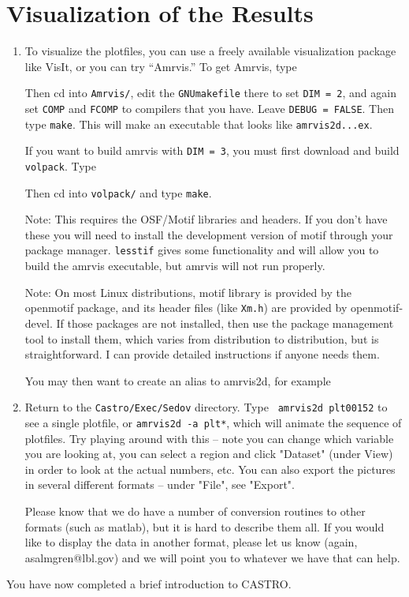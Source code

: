 \section{Visualization of the Results}

\begin{enumerate}

\item To visualize the plotfiles, you can use a freely available visualization package
like VisIt, or you can try ``Amrvis.'' To get Amrvis, type


\noindent Then cd into {\tt Amrvis/}, edit the {\tt GNUmakefile} there
to set {\tt DIM = 2}, and again set {\tt COMP} and {\tt FCOMP} to compilers that
you have. Leave {\tt DEBUG = FALSE}. Then type {\tt make}.  This will make an
executable that looks like {\tt amrvis2d...ex}.

If you want to build amrvis with {\tt DIM = 3}, you must first download and build {\tt volpack}.  Type


\noindent Then cd into {\tt volpack/} and type {\tt make}.

\noindent Note: This requires the OSF/Motif libraries and headers. If you don't have these 
you will need to install the development version of motif through your package manager. 
{\tt lesstif} gives some functionality and will allow you to build the amrvis executable, 
but amrvis will not run properly.

\noindent Note: On most Linux distributions, motif library is provided
by the openmotif package, and its header files (like {\tt Xm.h}) are
provided by openmotif-devel. If those packages are not installed, then
use the package management tool to install them, which varies from
distribution to distribution, but is straightforward. I can provide
detailed instructions if anyone needs them.

You may then want to create an alias to amrvis2d, for example


\item Return to the {\tt Castro/Exec/Sedov} directory.  Type {\tt
  amrvis2d plt00152} to see a single plotfile, or {\tt amrvis2d -a
  plt*}, which will animate the sequence of plotfiles. Try playing
  around with this -- note you can change which variable you are
  looking at, you can select a region and click "Dataset" (under View)
  in order to look at the actual numbers, etc. You can also export the
  pictures in several different formats -- under "File", see "Export".

Please know that we do have a number of conversion routines to other
formats (such as matlab), but it is hard to describe them all. If you
would like to display the data in another format, please let us know
(again, asalmgren@lbl.gov) and we will point you to whatever we have
that can help.

\end{enumerate}

You have now completed a brief introduction to CASTRO. 
